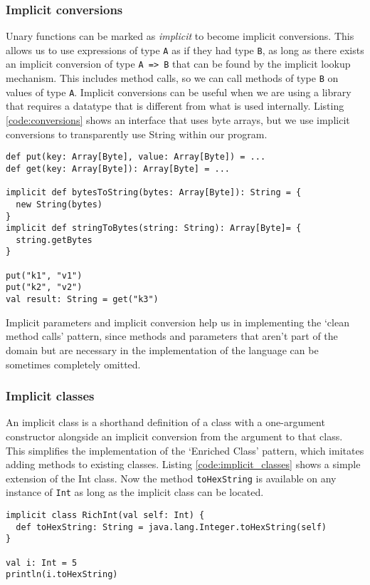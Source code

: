 \subsubsection{Implicit conversions}
Unary functions can be marked as {\it implicit} to become implicit conversions.
This allows us to use expressions of type \texttt{A} as if they had type \texttt{B}, as long as there exists an implicit conversion of type \texttt{A => B} that can be found by the implicit lookup mechanism.
This includes method calls, so we can call methods of type \texttt{B} on values of type \texttt{A}.
Implicit conversions can be useful when we are using a library that requires a datatype that is different from what is used internally.
Listing \ref{code:conversions} shows an interface that uses byte arrays, but we use implicit conversions to transparently use String within our program.

\begin{lstlisting}[caption=Implicit conversions, label=code:conversions, float]
def put(key: Array[Byte], value: Array[Byte]) = ...
def get(key: Array[Byte]): Array[Byte] = ...

implicit def bytesToString(bytes: Array[Byte]): String = {
  new String(bytes)
}
implicit def stringToBytes(string: String): Array[Byte]= {
  string.getBytes
}

put("k1", "v1")
put("k2", "v2")
val result: String = get("k3")
\end{lstlisting}

Implicit parameters and implicit conversion help us in implementing the `clean method calls' pattern, since methods and parameters that aren't part of the domain but are necessary in the implementation of the language can be sometimes completely omitted.

\subsubsection{Implicit classes}
An implicit class is a shorthand definition of a class with a one-argument constructor alongside an implicit conversion from the argument to that class.
This simplifies the implementation of the `Enriched Class' pattern, which imitates adding methods to existing classes.
Listing \ref{code:implicit_classes} shows a simple extension of the Int class.
Now the method \texttt{toHexString} is available on any instance of \texttt{Int} as long as the implicit class can be located.

\begin{lstlisting}[caption=Implicit class, label=code:implicit_classes, float]
implicit class RichInt(val self: Int) {
  def toHexString: String = java.lang.Integer.toHexString(self)
}

val i: Int = 5
println(i.toHexString)
\end{lstlisting}

